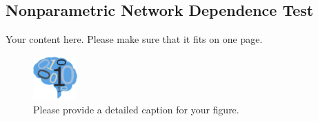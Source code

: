 \documentclass[simplex.tex]{subfiles}
\begin{document}
\subsection{Nonparametric Network Dependence Test} 
Your content here. Please make sure that it fits on one page.

\begin{figure}[!h]
\begin{cframed}
\centering
\includegraphics[width=0.15\textwidth]{neurodata_small.png}
\caption{Please provide a detailed caption for your figure.}
\label{fig:name}
\end{cframed}
\end{figure}
%
%
\end{document}
